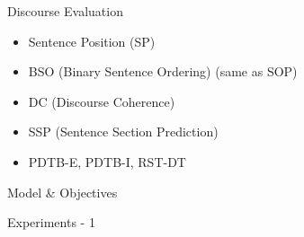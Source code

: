 \documentclass[10pt]{beamer}
\begin{document}
\begin{frame}{Discourse Evaluation}

    \begin{itemize}
        \item Sentence Position (SP)
        \item BSO (Binary Sentence Ordering) (same as SOP)
        \item DC (Discourse Coherence)
        \item SSP (Sentence Section Prediction)
        \item PDTB-E, PDTB-I, RST-DT
    \end{itemize}

\end{frame}

\begin{frame}{Model \& Objectives}
    \begin{figure}
        \begin{center}
        \end{center}
    \end{figure}
\end{frame}

\begin{frame}{Experiments - 1}
    \begin{figure}
        \begin{center}
        \end{center}
    \end{figure}
\end{frame}
\end{document}
